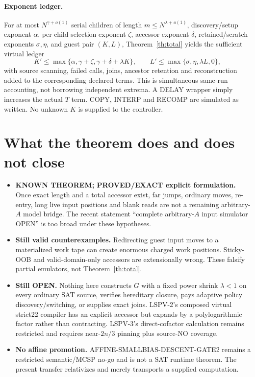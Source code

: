 \documentclass[11pt]{article}
\begin{document}
\paragraph{Exponent ledger.}
For at most $N^{\gamma+o(1)}$ serial children of length $m\le N^{\lambda+o(1)}$, discovery/setup exponent $\alpha$, per-child selection exponent $\zeta$, accessor exponent $\delta$, retained/scratch exponents $\sigma,\eta$, and guest pair $(K,L)$, Theorem~\ref{th:total} yields the sufficient virtual ledger
\[
 K'\le\max\{\alpha,\gamma+\zeta,\gamma+\delta+\lambda K\},\qquad
 L'\le\max\{\sigma,\eta,\lambda L,0\},
\]
with source scanning, failed calls, joins, ancestor retention and reconstruction added to the corresponding declared terms. This is simultaneous same-run accounting, not borrowing independent extrema. A DELAY wrapper simply increases the actual $T$ term. COPY, INTERP and RECOMP are simulated as written. No unknown $K$ is supplied to the controller.

\section{What the theorem does and does not close}
\begin{itemize}
\item \textbf{KNOWN THEOREM; PROVED/EXACT explicit formulation.} Once exact length and a total accessor exist, far jumps, ordinary moves, re-entry, long live input positions and blank reads are not a remaining arbitrary-$A$ model bridge. The recent statement ``complete arbitrary-$A$ input simulator OPEN'' is too broad under these hypotheses.
\item \textbf{Still valid counterexamples.} Redirecting guest input moves to a materialized work tape can create enormous charged work positions. Sticky-OOB and valid-domain-only accessors are extensionally wrong. These falsify partial emulators, not Theorem~\ref{th:total}.
\item \textbf{Still OPEN.} Nothing here constructs $G$ with a fixed power shrink $\lambda<1$ on every ordinary SAT source, verifies hereditary closure, pays adaptive policy discovery/switching, or supplies exact joins. LSPV-2's composed virtual strict22 compiler has an explicit accessor but expands by a polylogarithmic factor rather than contracting. LSPV-3's direct-cofactor calculation remains restricted and requires near-$2n/3$ pinning plus source-NO coverage.
\item \textbf{No affine promotion.} AFFINE-SMALLBIAS-DESCENT-GATE2 remains a restricted semantic/MCSP no-go and is not a SAT runtime theorem. The present transfer relativizes and merely transports a supplied computation.
\end{itemize}
\end{document}
